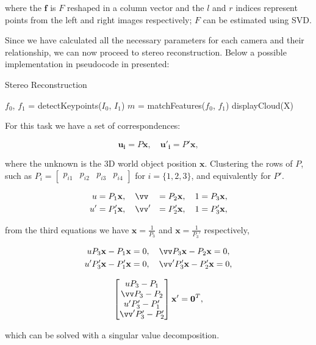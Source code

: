 \documentclass[12pt]{article}
\begin{document}
where the $\mathbf{f}$ is $F$ reshaped in a column vector and the $l$ and $r$ indices represent points from the left and right images respectively; $F$ can be estimated using SVD.

Since we have calculated all the necessary parameters for each camera and their relationship, we can now proceed to stereo reconstruction.
Below a possible implementation in pseudocode in presented:

\begin{algorithm}[H]
 \caption{Stereo Reconstruction}
 $f_0$, $f_1$ = detectKeypoints($I_0$, $I_1$)\;
 $m$ = matchFeatures($f_0$, $f_1$)\;
 displayCloud(X)\;
\end{algorithm}

For this task we have a set of correspondences:

\begin{equation}
 \mathbf{u_{i}} = P\mathbf{x}, \quad \mathbf{u'_{i}} = P'\mathbf{x},
\end{equation}

where the unknown is the 3D world object position $\mathbf{x}$.
Clustering the rows of $P$, such as $P_i = \begin{bmatrix} p_{i1} & p_{i2} & p_{i3} & p_{i4}  \end{bmatrix}$ for $i = \lbrace 1, 2, 3 \rbrace$, and equivalently for $P'$.

\begin{equation}
\begin{aligned}
 u &= P_1\mathbf{x}, \quad \vv &= P_2\mathbf{x}, \quad 1 &= P_3\mathbf{x},\\
 u' &= P_1'\mathbf{x}, \quad \vv' &= P_2'\mathbf{x}, \quad 1 &= P_3'\mathbf{x},\\
\end{aligned}
\end{equation}

from the third equations we have  $\mathbf{x} = \frac{1}{P_3}$ and $\mathbf{x} = \frac{1}{P_3'}$ respectively,

\begin{equation}
\begin{aligned}
	uP_3\mathbf{x} - P_1\mathbf{x} &= 0, \quad \vv P_3\mathbf{x} - P_2\mathbf{x} = 0,\\
	u'P_3'\mathbf{x} - P_1'\mathbf{x} &= 0, \quad \vv' P_3'\mathbf{x} - P_2'\mathbf{x} = 0,\\
\end{aligned}
\end{equation}

\begin{equation}
	\begin{bmatrix}
	uP_3 - P_1 \\
	\vv P_3 - P_2 \\
	u'P_3' - P_1' \\
	\vv' P_3' - P_2'	
	\end{bmatrix}
	\mathbf{x}'
	= \mathbf{0}^T,
\end{equation}

which can be solved with a singular value decomposition.
\end{document}

